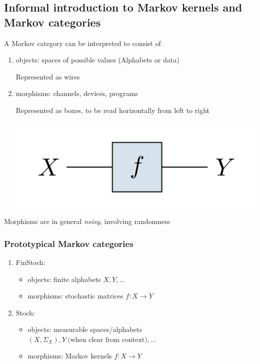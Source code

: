 % 
%
%

\subsection{Informal introduction to Markov kernels and Markov categories}

\begin{frame}
    A Markov category can be interpreted to consist of
    \begin{enumerate}\pause
        \item objects: spaces of possible values (Alphabets or data)\par
            Represented as wires\pause
        \item morphisms: channels, devices, programs\par
            Represented as boxes, to be read horizontally from left to right

            \includegraphics[width=.4\textwidth]{graphics/string/markov_morphism.png}
    \end{enumerate}\pause
    Morphisms are in general \emph{noisy}, involving randomness
\end{frame}

\begin{frame}
    \frametitle{Prototypical Markov categories}
    \begin{enumerate}
        \item FinStoch: 
            \begin{itemize}
                \item objects: finite alphabets $X, Y, \dots$
                \item morphisms: stochastic matrices $f: X\to Y$
            \end{itemize}
        \item Stoch: 
            \begin{itemize}
                \item objects: measurable spaces/alphabets $(X, \Sigma_X), Y\ \text{(when clear from context)}, \dots$
                \item morphisms: Markov kernels $f: X\to Y$
            \end{itemize}
    \end{enumerate}
\end{frame}

